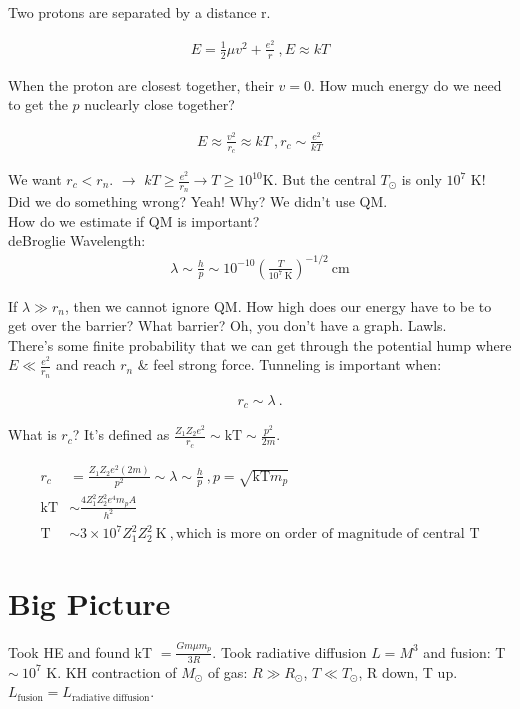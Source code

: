 \documentclass[10pt,a4paper]{article}
\newcommand{\ra}{\rightarrow}
\begin{document}
Two protons are separated by a distance r.

\begin{align}
E = \frac{1}{2} \mu v^2 + \frac{e^2}{r}~, E \approx kT
\end{align}

When the proton are closest together, their $v=0$. How much energy do we need to get the $p$ nuclearly close together? 

\begin{align}
E \approx \frac{v^2}{r_c} \approx kT~, r_c \sim \frac{e^2}{kT}
\end{align} 

We want $r_c < r_n$. $\ra$ $kT \geq \frac{e^2}{r_n} \ra T \geq 10^{10}$K. But the central $T_\odot$ is only $10^7$ K! Did we do something wrong? Yeah! Why? We didn't use QM.\\
How do we estimate if QM is important? \\

deBroglie Wavelength:
\begin{align}
\lambda \sim \frac{h}{p} \sim 10^{-10} \left( \frac{T}{10^7 ~\text{K}} \right)^{-1/2}~ \text{cm}
\end{align}

If $\lambda \gg r_n$, then we cannot ignore QM. How high does our energy have to be to get over the barrier? What barrier? Oh, you don't have a graph. Lawls. \\

There's some finite probability that we can get through the potential hump where $E \ll \frac{e^2}{r_n}$ and reach $r_n$ \& feel strong force. Tunneling is important when:

\begin{align}
r_c \sim \lambda ~.
\end{align}

What is $r_c$? It's defined as $\frac{Z_1 Z_2 e^2}{r_c} \sim \text{kT} \sim \frac{p^2}{2m}$. 

\begin{align}
r_c & = \frac{Z_1 Z_2 e^2 (2m)}{p^2} \sim \lambda \sim \frac{h}{p}~, p = \sqrt{\text{kT} m_p}\\
\text{kT} & \sim \frac{4 Z_1^2 Z_2^2 e^4 m_p A}{h^2}\\
\text{T} & \sim 3 \times 10^7 Z_1^2 Z_2^2 ~\text{K}~, \text{which is more on order of magnitude of central T}
\end{align}

\section{Big Picture}
Took HE and found kT $=\frac{Gm \mu m_p}{3R}$. Took radiative diffusion $L = M^3$ and fusion: T $\sim~10^7$ K. KH contraction of $M_\odot$ of gas: $R \gg R_\odot$, $T \ll T_\odot$, R down, T up. $L_{\text{fusion}} = L_{\text{radiative diffusion}}$. 
\end{document}
